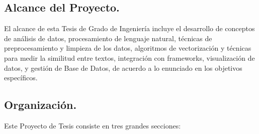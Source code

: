 \documentclass[12pt,a4paper]{article}
\begin{document}
\cleardoublepage    %

\subsection{Alcance del Proyecto.}
El alcance de esta Tesis de Grado de Ingeniería incluye el desarrollo de conceptos de análisis de datos, procesamiento de lenguaje natural, técnicas de preprocesamiento y limpieza de los datos, algoritmos de vectorización y técnicas para medir la similitud entre textos, integración con frameworks, visualización de datos, y gestión de Base de Datos, de acuerdo a lo enunciado en los objetivos específicos.

\subsection{Organización.}
Este Proyecto de Tesis consiste en tres grandes secciones:
\end{document}
